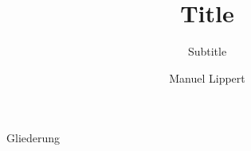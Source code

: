 \documentclass[compress,aspectratio=169]{beamer}
\title{Title}
\subtitle{Subtitle}
\author{Manuel Lippert}
\institute{Physik (Master of Science)}
\begin{document}
	\maketitle

	\begin{frame}{Gliederung}
		\tableofcontents[hideallsubsections]
	\end{frame}
	
	\centering
\end{document}
